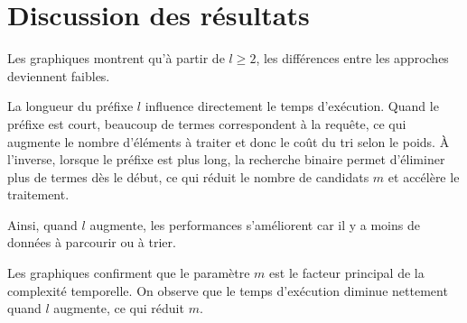 \section{Discussion des résultats}

Les graphiques montrent qu'à partir de $l \geq 2$,
les différences entre les approches deviennent faibles.

La longueur du préfixe $l$ influence directement le temps d'exécution.
Quand le préfixe est court, beaucoup de termes correspondent à la requête,
ce qui augmente le nombre d'éléments à traiter et donc le coût du tri selon le poids.
À l'inverse, lorsque le préfixe est plus long,
la recherche binaire permet d'éliminer plus de termes dès le début,
ce qui réduit le nombre de candidats $m$ et accélère le traitement.

Ainsi, quand $l$ augmente,
les performances s'améliorent car il y a moins de données à parcourir ou à trier.

Les graphiques confirment que le paramètre $m$ est le facteur principal de la complexité temporelle.
On observe que le temps d'exécution diminue nettement quand $l$ augmente, ce qui réduit $m$.
